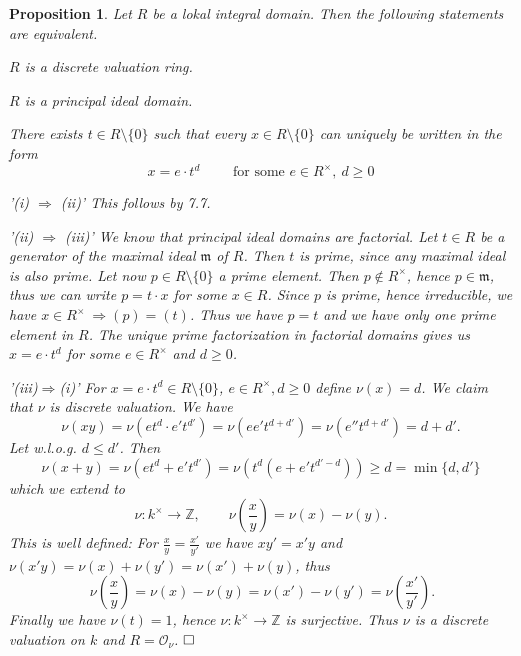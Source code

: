 \documentclass[11pt]{book}
\newtheorem{proposition}[theorem]{Proposition}
\theoremstyle{nonumberbreak}
\newenvironment{pr}[1][]{\ifthenelse{\equal{#1}{}}{\proof}{\proof[#1]}\rm}{\endproof}
\begin{document}
\begin{spacing}{1.3}
\begin{proposition} %
Let $R$ be a lokal integral domain. Then the following statements are equivalent.
\begin{compactenum}
\item $R$ is a discrete valuation ring.
\item $R$ is a principal ideal domain.
\item There exists $t \in R\setminus \{0\}$ such that every $x \in R \setminus \{0\}$ can uniquely be written in the form $$x=e \cdot t^d \qquad \textrm{ for some } e \in R^{\times}, \ d \geqslant 0$$
\end{compactenum}
\begin{pr}
\begin{compactitem}
\item['(i) $\Rightarrow$ (ii)'] This follows by 7.7.
\item['(ii) $\Rightarrow$ (iii)'] We know that principal ideal domains are factorial. Let $t \in R$ be a generator of the maximal ideal $\mathfrak{m}$ of $R$. Then $t$ is prime, since any maximal ideal is also prime. Let now $p \in R\setminus \{0\}$ a prime element. Then $p \notin R^{\times}$, hence $p \in \mathfrak{m}$, thus we can write $p=t \cdot x$ for some $x \in R$.  Since $p$ is prime, hence irreducible, we have $x \in R^{\times} \ \Rightarrow ( p ) = ( t )$.
Thus we have $p=t$ and we have only one prime element in $R$. The unique prime factorization in factorial domains gives us $x= e \cdot t^d$ for some $ e \in R^{\times}$ and $d \geqslant 0$. 
\item['(iii)$\Rightarrow$(i)'] For $x= e \cdot t^d \in R \setminus \{0\}$, $e \in R^{\times}, d \geqslant 0$ define $\nu(x)=d$. 
We claim that $\nu$ is discrete valuation. We have
$$\nu(xy)=\nu\left( e t^d \cdot e' t^{d'}\right)=\nu\left(ee't^{d+d'}\right)=\nu\left(e''t^{d+d'}\right)=d+d'.$$
Let w.l.o.g. $d \leqslant d'$. Then
$$\nu(x+y)=\nu\left(et^d+e't^{d'}\right) = \nu \left(t^d \left(e+e' t^{d'-d}\right)\right) \geqslant d = \min\{d,d'\}$$
which we extend to $$\nu: k^{\times} \longrightarrow \mathbb{Z},  \qquad \nu\left(\frac{x}{y}\right)=\nu(x)-\nu(y).$$ This is well defined:
For $\frac{x}{y}=\frac{x'}{y'}$ we have $xy'=x'y$ and $\nu(x'y)=\nu(x)+\nu(y')=\nu(x')+\nu(y)$, thus  $$\ \nu\left(\frac{x}{y}\right)=\nu(x)-\nu(y)=\nu(x')-\nu(y')=\nu\left(\frac{x'}{y'}\right).$$
Finally we have $\nu(t)=1$, hence $\nu:k^{\times} \longrightarrow \mathbb{Z}$ is surjective.
Thus $\nu$ is a discrete valuation on $k$ and $R=\mathcal{O}_{\nu}$. $\hfill \Box$
\end{compactitem}
\end{pr}
\end{proposition}


\end{spacing}
\end{document}
